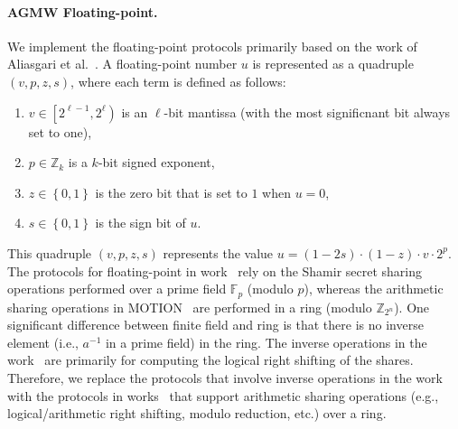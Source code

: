 \paragraph{AGMW Floating-point.}
We implement the \arithmeticGMW floating-point protocols primarily based on the work of Aliasgari et al.~\cite{aliasgari2012secure}.
A floating-point number $u$ is represented as a quadruple $\left(v, p, z, s\right) $, where each term is defined as follows:
\begin{enumerate}
      \item $v\in \left[2^{\ell-1},2^{\ell}\right) $ is an $\ell$-bit mantissa (with the most significnant bit always set to one),
      \item $p\in \mathbb{Z} _k$ is a $k$-bit signed exponent,
      \item $z\in \left\{0,1\right\} $ is the zero bit that is set to $1$ when $u=0$,
      \item $s\in \left\{0,1\right\}$ is the sign bit of $u$.
\end{enumerate}
This quadruple $\left(v, p, z, s\right) $ represents the value $u= \left(1-2s\right) \cdot \left(1-z\right) \cdot v \cdot 2^p$.
The \smpc protocols for floating-point in work~\cite{aliasgari2012secure} rely on the Shamir secret sharing~\cite{shamir1979share} operations performed over a prime field $\mathbb{F}_p$ (modulo $p$), whereas the arithmetic sharing operations in MOTION~\cite{braun2022motion} are performed in a ring (modulo $\mathbb{Z} _{2^{n}}$). One significant difference between finite field and ring is that there is no inverse element (i.e., $a^{-1}$ in a prime field) in the ring. The inverse operations in the work~\cite{aliasgari2012secure} are primarily for computing the logical right shifting of the shares.
Therefore, we replace the protocols that involve inverse operations in the work~\cite{aliasgari2012secure} with the \smpc protocols in works~\cite{escudero2020improved,dalskov2020secure,makri2021rabbit} that support arithmetic sharing operations (e.g., logical/arithmetic right shifting, modulo reduction, etc.) over a ring.

